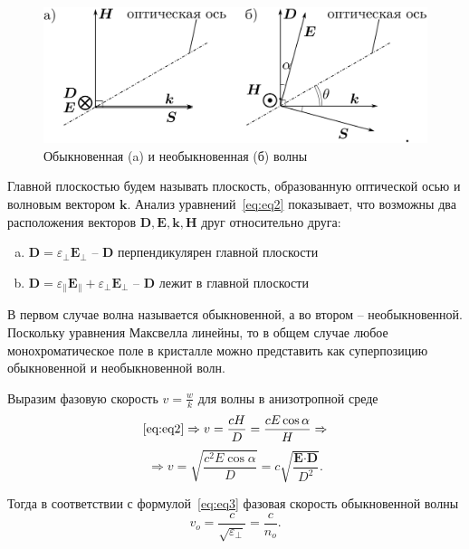 \documentclass[12pt]{article}
\renewcommand{\vec}{\textbf}
\begin{document}
    \begin{figure}
        \label{fig:fig1}
        \centering
        \includegraphics[width=\linewidth]{pic/vecdiag}
        \caption{Обыкновенная (a) и необыкновенная (б) волны}
    \end{figure}
    Главной плоскостью будем называть плоскость, образованную оптической осью и волновым вектором $\vec{k}$.
    Анализ уравнений\ \eqref{eq:eq2} показывает, что возможны два расположения векторов
    $\vec{D}, \vec{E}, \vec{k}, \vec{H}$ друг относительно друга:
    \begin{enumerate}[(a)]
        \item $\vec{D} = \varepsilon_{\perp} \vec{E}_{\perp}$ -- $\vec{D}$ перпендикулярен главной плоскости
        \item $\vec{D} = \varepsilon_{\parallel} \vec{E}_{\parallel} + \varepsilon_{\perp} \vec{E}_{\perp}$ --
        $\vec{D}$ лежит в главной плоскости
    \end{enumerate}

    В первом случае волна называется обыкновенной, а во втором -- необыкновенной.
    Поскольку уравнения Максвелла линейны, то в общем случае любое монохроматическое поле в кристалле
    можно представить как суперпозицию обыкновенной и необыкновенной волн.

    Выразим фазовую скорость $v = \frac{w}{k}$ для волны в анизотропной среде
    \begin{equation*}
        \eqref{eq:eq2} \Rightarrow v = \frac{cH}{D} = \frac{cE\cos{\alpha}}{H} \Rightarrow
    \end{equation*}
    \begin{equation}
        \label{eq:eq3}
        \Rightarrow v = \sqrt{\frac{c^2E\cos{\alpha}}{D}} = c\sqrt{\frac{\vec{E}\cdot\vec{D}}{D^2}}.
    \end{equation}

    Тогда в соответствии с формулой\ \eqref{eq:eq3} фазовая скорость обыкновенной волны
    \begin{equation}
        \label{eq:eq4}
        v_o = \frac{c}{\sqrt{\varepsilon_{\perp}}} = \frac{c}{n_o}.
    \end{equation}
\end{document}
